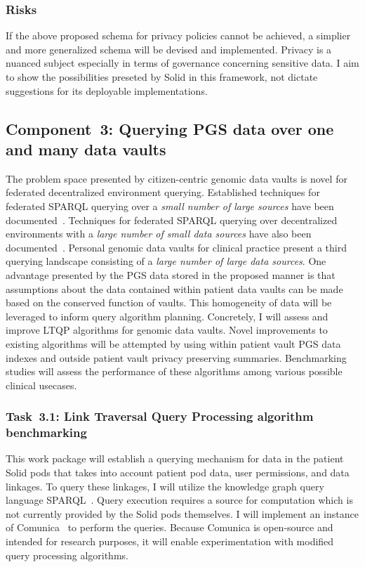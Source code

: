\documentclass[a4paper,11pt]{article}
\begin{document}
\begin{refsection}
\subsubsection{Risks}
If the above proposed schema for privacy policies cannot be achieved, a simplier and more generalized schema will be devised and implemented.
Privacy is a nuanced subject especially in terms of governance concerning sensitive data. 
I aim to show the possibilities preseted by Solid in this framework, not dictate suggestions for its deployable implementations. 


\newcommand\WPc{Querying PGS data over one and many data vaults}
\subsection{Component~3: \WPc}

The problem space presented by citizen-centric genomic data vaults is novel for federated decentralized environment querying. 
Established techniques for federated SPARQL querying over a \emph{small number of large sources} have been documented~\cite{hibiscus, tpf}.
Techniques for federated SPARQL querying over decentralized environments with a \emph{large number of small data sources} have also been documented~\cite{taelman_LTQP_2023}.
Personal genomic data vaults for clinical practice present a third querying landscape consisting of a \emph{large number of large data sources}.
One advantage presented by the PGS data stored in the proposed manner is that assumptions about the data contained within patient data vaults can be made based on the conserved function of vaults.
This homogeneity of data will be leveraged to inform query algorithm planning.
Concretely, I will assess and improve LTQP algorithms for genomic data vaults.
Novel improvements to existing algorithms will be attempted by using within patient vault PGS data indexes and outside patient vault privacy preserving summaries.
Benchmarking studies will assess the performance of these algorithms among various possible clinical usecases.


\newcommand\WPca{Link Traversal Query Processing algorithm benchmarking}
\subsubsection{Task~3.1: \WPca}

This work package will establish a querying mechanism for data in the patient Solid pods that takes into account patient pod data, user permissions, and data linkages. 
To query these linkages, I will utilize the knowledge graph query language SPARQL~\cite{spec:sparqllang}.
Query execution requires a source for computation which is not currently provided by the Solid pods themselves.
I will implement an instance of Comunica~\cite{comunica} to perform the queries.
Because Comunica is open-source and intended for research purposes, it will enable experimentation with modified query processing algorithms. 


\end{refsection}
\end{document}

